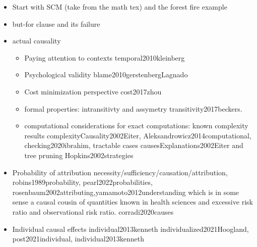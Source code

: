 \documentclass{article}
\begin{document}
\begin{itemize}

\item Start with SCM (take from the math tex) and the forest fire example

\item but-for clause and its failure


\item actual causality

\begin{itemize}

\item Paying attention to contexts temporal2010kleinberg

\item Psychological validity blame2010gerstenbergLagnado

\item Cost minimization perspective cost2017zhou

\item formal properties: intransitivty and assymetry transitivity2017beckers.

\item computational considerations for exact computations: known complexity results complexityCausality2002Eiter, Aleksandrowicz2014computational,  checking2020ibrahim, tractable cases causesExplanations2002Eiter and tree pruning Hopkins2002strategies


\end{itemize}


\item Probability of attribution necessity/sufficiency/causation/attribution, robins1989probability, pearl2022probabilities, rosenbaum2002attributing,yamamoto2012understanding which is in some sense a causal cousin of quantities known in health sciences and excessive risk ratio and observational risk ratio. corradi2020causes



\item Individual causal effects individual2013kenneth individualized2021Hoogland, post2021individual, individual2013kenneth




\end{itemize}
\end{document}
